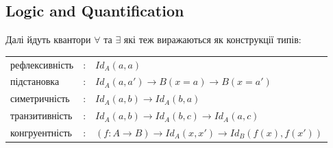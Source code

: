 \documentclass[11pt,oneside]{article}
\begin{document}
  \subsection{Logic and Quantification}

Далі йдуть квантори $\forall$ та $\exists$ які теж виражаються як конструкції типів:

\begingroup
\parbox[t][][l]{0.40\textwidth}{

\begin{prooftree}
\end{prooftree}

\begin{prooftree}
\end{prooftree}

}
\hspace{0.1cm}
\parbox[t][][r]{0.60\textwidth}{

\begin{prooftree}
\end{prooftree}


\begin{prooftree}
\end{prooftree}

}
\endgroup

\begingroup
\parbox[t][][l]{0.40\textwidth}{

\begin{prooftree}
\end{prooftree}

}
\hspace{0.1cm}
\parbox[t][][r]{0.60\textwidth}{

}\endgroup


\begin{center}
\begin{tabular}{lll}
  рефлексивність &:& $Id_A(a,a)$ \\
  підстановка    &:& $Id_A(a,a') \rightarrow B(x=a) \rightarrow B(x=a')$ \\
  симетричність  &:& $Id_A(a,b) \rightarrow Id_A(b,a)$  \\
  транзитивність &:& $Id_A(a,b) \rightarrow Id_A(b,c) \rightarrow Id_A(a,c)$ \\
  конгруентність &:& $(f: A \rightarrow B) \rightarrow Id_A(x,x') \rightarrow Id_B(f(x),f(x'))$ \\
\end{tabular}
\end{center}
\end{document}
